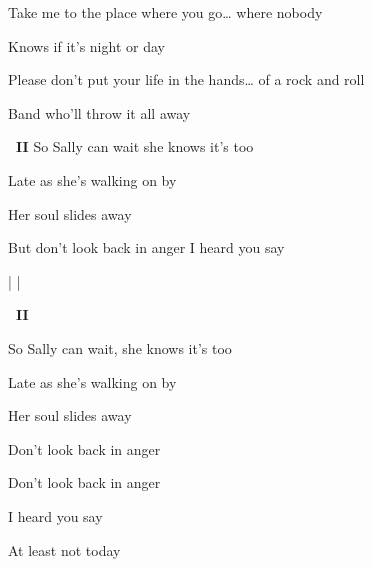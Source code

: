 \begin{song}
\bigskip

Take me to the place where you go… where nobody \par
{}Knows  if it’s night or day  \par
{}Please don’t put your life in the hands… of a rock and roll \par
{}Band  who’ll throw it all away  \par

\bigskip

\Prechorus

\bigskip

\begin{chorusbox}{\Chorus\textbf{\smaller\ II}}
So Sally can wait she knows it’s too \par
{}Late as she's walking on by  \par
Her soul slides away  \par
But don’t look back in anger  I heard you say  \par
\end{chorusbox}

\bigskip

    \par
{}  |    |  \par

\bigskip

\Chorus\textbf{\smaller\ II}

\bigskip

So Sally can wait, she knows it’s too \par
{}Late as she's walking on by  \par
Her soul slides away \par
Don’t look back in anger \par
Don’t look back in anger \par
I heard you say    \par
{}  At least not today \par

\end{song}
